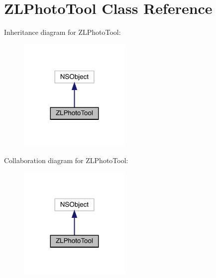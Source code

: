 \hypertarget{interface_z_l_photo_tool}{}\section{Z\+L\+Photo\+Tool Class Reference}
\label{interface_z_l_photo_tool}


Inheritance diagram for Z\+L\+Photo\+Tool\+:\nopagebreak
\begin{figure}[H]
\begin{center}
\leavevmode
\includegraphics[width=152pt]{interface_z_l_photo_tool__inherit__graph}
\end{center}
\end{figure}


Collaboration diagram for Z\+L\+Photo\+Tool\+:\nopagebreak
\begin{figure}[H]
\begin{center}
\leavevmode
\includegraphics[width=152pt]{interface_z_l_photo_tool__coll__graph}
\end{center}
\end{figure}
